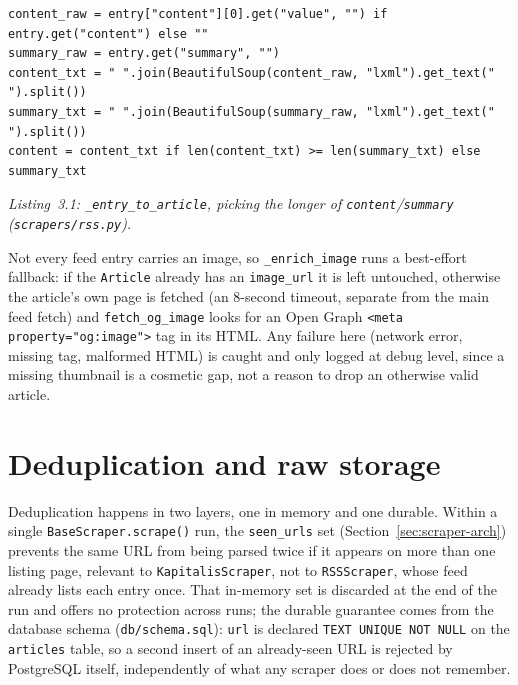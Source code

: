 \begin{verbatim}
content_raw = entry["content"][0].get("value", "") if entry.get("content") else ""
summary_raw = entry.get("summary", "")
content_txt = " ".join(BeautifulSoup(content_raw, "lxml").get_text(" ").split())
summary_txt = " ".join(BeautifulSoup(summary_raw, "lxml").get_text(" ").split())
content = content_txt if len(content_txt) >= len(summary_txt) else summary_txt
\end{verbatim}
\begin{center}
\textit{Listing~3.1: \texttt{\_entry\_to\_article}, picking the longer of \texttt{content}/\texttt{summary} (\texttt{scrapers/rss.py}).}
\end{center}

Not every feed entry carries an image, so \texttt{\_enrich\_image} runs a best-effort fallback: if the \texttt{Article} already has an \texttt{image\_url} it is left untouched, otherwise the article's own page is fetched (an 8-second timeout, separate from the main feed fetch) and \texttt{fetch\_og\_image} looks for an Open Graph \texttt{<meta property="og:image">} tag in its HTML. Any failure here (network error, missing tag, malformed HTML) is caught and only logged at debug level, since a missing thumbnail is a cosmetic gap, not a reason to drop an otherwise valid article.

\section{Deduplication and raw storage}
\label{sec:dedup}
Deduplication happens in two layers, one in memory and one durable. Within a single \texttt{BaseScraper.\allowbreak scrape()} run, the \texttt{seen\_urls} set (Section~\ref{sec:scraper-arch}) prevents the same URL from being parsed twice if it appears on more than one listing page, relevant to \texttt{Kapitalis\allowbreak Scraper}, not to \texttt{RSSScraper}, whose feed already lists each entry once. That in-memory set is discarded at the end of the run and offers no protection across runs; the durable guarantee comes from the database schema (\texttt{db/schema.sql}): \texttt{url} is declared \texttt{TEXT UNIQUE NOT NULL} on the \texttt{articles} table, so a second insert of an already-seen URL is rejected by PostgreSQL itself, independently of what any scraper does or does not remember.

